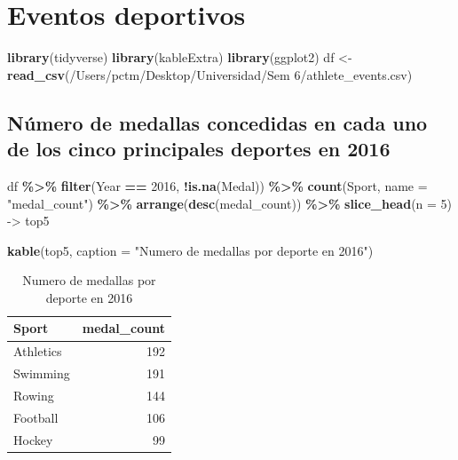 \documentclass[
]{book}
\newenvironment{Shaded}{\begin{snugshade}}{\end{snugshade}}
\newcommand{\AttributeTok}[1]{\textcolor[rgb]{0.13,0.29,0.53}{#1}}
\newcommand{\DecValTok}[1]{\textcolor[rgb]{0.00,0.00,0.81}{#1}}
\newcommand{\FunctionTok}[1]{\textcolor[rgb]{0.13,0.29,0.53}{\textbf{#1}}}
\newcommand{\NormalTok}[1]{#1}
\newcommand{\OtherTok}[1]{\textcolor[rgb]{0.56,0.35,0.01}{#1}}
\newcommand{\SpecialCharTok}[1]{\textcolor[rgb]{0.81,0.36,0.00}{\textbf{#1}}}
\newcommand{\StringTok}[1]{\textcolor[rgb]{0.31,0.60,0.02}{#1}}
\begin{document}
\section*{Eventos deportivos}\label{eventos-deportivos}

\begin{Shaded}
\begin{Highlighting}[]
\FunctionTok{library}\NormalTok{(tidyverse)}
\FunctionTok{library}\NormalTok{(kableExtra)}
\FunctionTok{library}\NormalTok{(ggplot2)}
\NormalTok{df }\OtherTok{\textless{}{-}} \FunctionTok{read\_csv}\NormalTok{(}\StringTok{\textquotesingle{}/Users/pctm/Desktop/Universidad/Sem 6/athlete\_events.csv\textquotesingle{}}\NormalTok{)}
\end{Highlighting}
\end{Shaded}

\subsection*{Número de medallas concedidas en cada uno de los cinco principales deportes en 2016}\label{nuxfamero-de-medallas-concedidas-en-cada-uno-de-los-cinco-principales-deportes-en-2016}

\begin{Shaded}
\begin{Highlighting}[]
\NormalTok{df }\SpecialCharTok{\%\textgreater{}\%}
  \FunctionTok{filter}\NormalTok{(Year }\SpecialCharTok{==} \DecValTok{2016}\NormalTok{, }\SpecialCharTok{!}\FunctionTok{is.na}\NormalTok{(Medal)) }\SpecialCharTok{\%\textgreater{}\%}
  \FunctionTok{count}\NormalTok{(Sport, }\AttributeTok{name =} \StringTok{"medal\_count"}\NormalTok{) }\SpecialCharTok{\%\textgreater{}\%}
  \FunctionTok{arrange}\NormalTok{(}\FunctionTok{desc}\NormalTok{(medal\_count)) }\SpecialCharTok{\%\textgreater{}\%}
  \FunctionTok{slice\_head}\NormalTok{(}\AttributeTok{n =} \DecValTok{5}\NormalTok{) }\OtherTok{{-}\textgreater{}}\NormalTok{ top5}

\FunctionTok{kable}\NormalTok{(top5, }\AttributeTok{caption =} \StringTok{"Numero de medallas por deporte en 2016"}\NormalTok{)}
\end{Highlighting}
\end{Shaded}

\begin{table}

\caption{\label{tab:unnamed-chunk-9}Numero de medallas por deporte en 2016}
\centering
\begin{tabular}[t]{l|r}
\hline
Sport & medal\_count\\
\hline
Athletics & 192\\
\hline
Swimming & 191\\
\hline
Rowing & 144\\
\hline
Football & 106\\
\hline
Hockey & 99\\
\hline
\end{tabular}
\end{table}
\end{document}
